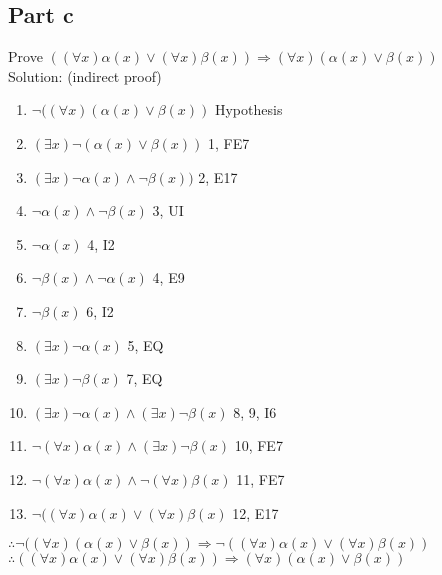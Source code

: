 \documentclass{article}
\begin{document}
		\subsection{Part c}
			Prove $((\forall x)\alpha(x) \lor (\forall x)\beta(x)) \Rightarrow (\forall x)(\alpha(x) \lor \beta(x))$ \\
			Solution: (indirect proof) \\
			\begin{enumerate}
				\item $\lnot((\forall x)(\alpha(x) \lor \beta(x))$ \hfill Hypothesis
				\item $(\exists x)\lnot(\alpha(x) \lor \beta(x))$ \hfill 1, FE7
				\item $(\exists x)\lnot\alpha(x) \land \lnot\beta(x))$ \hfill 2, E17
				\item $\lnot\alpha(x) \land \lnot\beta(x)$ \hfill 3, UI 
				\item $\lnot\alpha(x)$ \hfill 4, I2 
				\item $\lnot\beta(x) \land \lnot\alpha(x)$ \hfill 4, E9 
				\item $\lnot\beta(x)$ \hfill 6, I2
				\item $(\exists x)\lnot\alpha(x)$ \hfill 5, EQ
				\item $(\exists x)\lnot\beta(x)$ \hfill 7, EQ
				\item $(\exists x)\lnot\alpha(x) \land (\exists x)\lnot\beta(x)$ \hfill 8, 9, I6
				\item $\lnot(\forall x)\alpha(x) \land (\exists x)\lnot\beta(x)$ \hfill 10, FE7
				\item $\lnot(\forall x)\alpha(x) \land \lnot(\forall x)\beta(x)$ \hfill 11, FE7
				\item $\lnot((\forall x)\alpha(x) \lor (\forall x)\beta(x)$ \hfill 12, E17
			\end{enumerate}
			$\therefore \lnot((\forall x)(\alpha(x) \lor \beta(x)) \Rightarrow \lnot((\forall x)\alpha(x) \lor (\forall x)\beta(x))$ \\
			$\therefore ((\forall x)\alpha(x) \lor (\forall x)\beta(x)) \Rightarrow (\forall x)(\alpha(x) \lor \beta(x))$ \\
\end{document}

